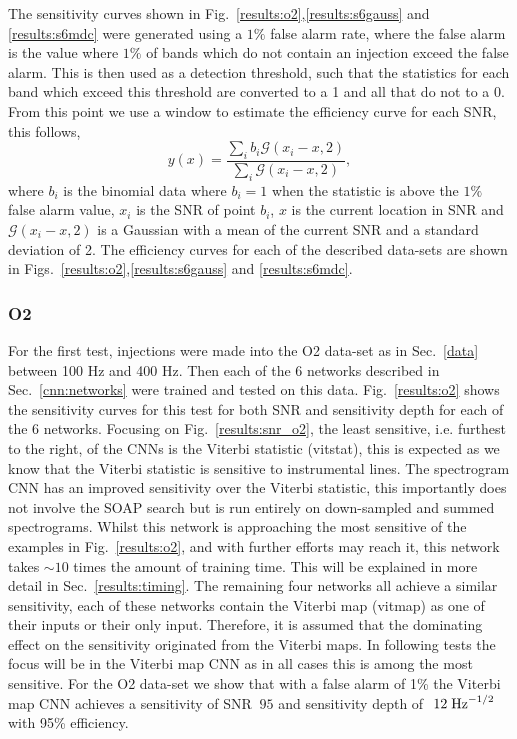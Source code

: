The sensitivity curves shown in Fig.~\ref{results:o2},\ref{results:s6gauss} and \ref{results:s6mdc} were generated using a $1\%$ false alarm rate, where the false alarm is the value where $1\%$ of bands which do not contain an injection exceed the false alarm. 
This is then used as a detection threshold, such that the statistics for each band which exceed this threshold are converted to a 1 and all that do not to a 0.
From this point we use a window to estimate the efficiency curve for each \ac{SNR}, this follows,
\begin{equation}
y(x) = \frac{\sum_i b_i \mathcal{G}(x_i - x,2)}{\sum_i \mathcal{G}(x_i - x,2)},
\end{equation}
where $b_i$ is the binomial data where $b_i=1$ when the statistic is above the $1\%$ false alarm value, $x_i$ is the \ac{SNR} of point $b_i$, $x$ is the current location in \ac{SNR} and $\mathcal{G}(x_i - x,2)$ is a Gaussian with a mean of the current \ac{SNR} and a standard deviation of 2.
The efficiency curves for each of the described data-sets are shown in Figs.~\ref{results:o2},\ref{results:s6gauss} and \ref{results:s6mdc}.

\subsubsection{O2}

For the first test, injections were made into the O2 data-set as in Sec.~\ref{data} between 100 Hz and 400 Hz. Then each of the 6 networks described in Sec.~\ref{cnn:networks} were trained and tested on this data. 
Fig.~\ref{results:o2} shows the sensitivity curves for this test for both \ac{SNR} and sensitivity depth for each of the 6 networks. Focusing on Fig.~\ref{results:snr_o2}, the least sensitive, i.e. furthest to the right, of the \acp{CNN} is the Viterbi statistic (vitstat), this is expected as we know that the Viterbi statistic is sensitive to instrumental lines. 
The spectrogram \ac{CNN} has an improved sensitivity over the Viterbi statistic, this importantly does not involve the SOAP search but is run entirely on down-sampled and summed spectrograms. 
Whilst this network is approaching the most sensitive of the examples in Fig.~\ref{results:o2}, and with further efforts may reach it, this network takes $\sim10$ times the amount of training time. This will be explained in more detail in Sec.~\ref{results:timing}.
The remaining four networks all achieve a similar sensitivity, each of these networks contain the Viterbi map (vitmap) as one of their inputs or their only input. Therefore, it is assumed that the dominating effect on the sensitivity originated from the Viterbi maps. In following tests the focus will be in the Viterbi map \ac{CNN} as in all cases this is among the most sensitive.
For the O2 data-set we show that with a false alarm of 1\% the Viterbi map \ac{CNN} achieves a sensitivity of SNR $~95$ and sensitivity depth of $~12\; {\rm Hz}^{-1/2}$ with 95\% efficiency.

